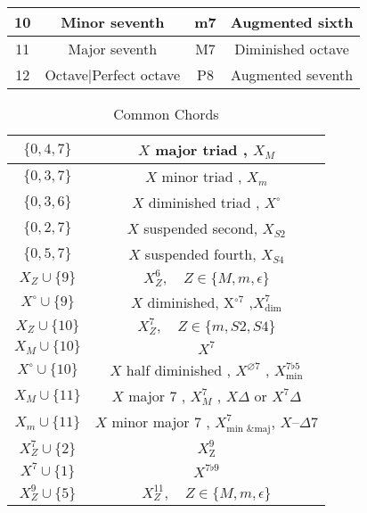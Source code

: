 \documentclass[pstricks]{amsart}
\begin{document}
\begin{table}[h]
\begin{tabular}{|c|c|c|c|}
    10                                                            & Minor seventh                  & m7                & Augmented sixth                \\ \hline
    11                                                            & Major seventh                  & M7                & Diminished octave              \\ \hline
    12                                                            & Octave|Perfect octave          & P8                & Augmented seventh              \\ \hline
  \end{tabular}
\end{table}


\begin{table}[]
\renewcommand{\arraystretch}{2}
\begin{tabular}{|c|c|}
\hline
 $\{0,4,7\}$ & $X$ major triad , $X_M$ \\ \hline
 $\{0,3,7\}$ & $X$ minor triad , $X_m$ \\ \hline
 $\{0,3,6\}$ & $X$ diminished triad , $X^\circ$ \\ \hline
  $\{0,2,7\}$& $X$ suspended second, $X_{S2}$\\ \hline
  $\{0,5,7\}$& $X$ suspended fourth, $X_{S4}$\\ \hline
 $X_Z \cup \{9\}$ & $X^6_Z, \quad Z \in \{ M, m, \epsilon \}$  \\ \hline
 $X^\circ \cup \{9\}$ &  $X$ diminished, X$^{\circ 7}$ ,$X^{7}_{\text{dim}}$ \\ \hline
 $X_Z \cup \{10\}$ & $X^7_Z, \quad Z \in \{  m, S2, S4 \}$  \\ \hline
 $X_M \cup \{10\}$ & $X^7$ \\ \hline
 $X^\circ \cup \{10\}$ & $X$ half diminished      , $X^{\varnothing 7}$        , $X^{7\flat 5}_{\text{min}} $  \\ \hline
 $X_M \cup \{11\}$ & $X$ major 7              , $X_M^7$ , $X\Delta$ or $X^7\Delta$ \\ \hline
 $X_m \cup \{11\}$ & $X$ minor major 7        , $X_{\text{min \& maj}}^7$,     $X – \Delta7$    \\ \hline
 $X_Z^7 \cup \{2\}$ & $X^9_{\text{Z}}$ \\ \hline
 $X^7 \cup \{1\}$ & $X^{7\flat 9}$ \\ \hline
  $X^9_Z \cup \{5\}$&  $X^{11}_Z, \quad Z \in \{ M, m, \epsilon \}$ \\ \hline
\end{tabular}
\caption*{Common Chords}
\end{table}
\renewcommand{\arraystretch}{1}
\end{document}
